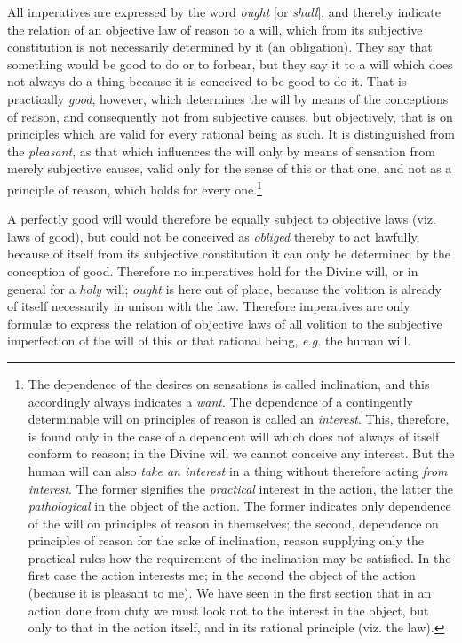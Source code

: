 All imperatives are expressed by the word \textit{ought} [or
\textit{shall}], and thereby indicate the relation of an objective law
of reason to a will, which from its subjective constitution is not
necessarily determined by it (an obligation). They say that something
would be good to do or to forbear, but they say it to a will which
does not always do a thing because it is conceived to be good to do
it. That is practically \textit{good}, however, which determines the
will by means of the conceptions of reason, and consequently not from
subjective causes, but objectively, that is on principles which are
valid for every rational being as such. It is distinguished from the
\textit{pleasant}, as that which influences the will only by means of
sensation from merely subjective causes, valid only for the sense of
this or that one, and not as a principle of reason, which holds for
every one.\footnote{The dependence of the desires on sensations is
called inclination, and this accordingly always indicates a
\textit{want}. The dependence of a contingently determinable will on
principles of reason is called an \textit{interest}. This, therefore,
is found only in the case of a dependent will which does not always of
itself conform to reason; in the Divine will we cannot conceive any
interest. But the human will can also \textit{take an interest} in a
thing without therefore acting \textit{from interest}. The former
signifies the \textit{practical} interest in the action, the latter
the \textit{pathological} in the object of the action. The former
indicates only dependence of the will on principles of reason in
themselves; the second, dependence on principles of reason for the
sake of inclination, reason supplying only the practical rules how the
requirement of the inclination may be satisfied. In the first case the
action interests me; in the second the object of the action (because
it is pleasant to me). We have seen in the first section that in an
action done from duty we must look not to the interest in the object,
but only to that in the action itself, and in its rational principle
(viz. the law).}

A perfectly good will would therefore be equally subject to
objective laws (viz. laws of good), but could not be conceived as
\textit{obliged} thereby to act lawfully, because of itself from its
subjective constitution it can only be determined by the conception of
good. Therefore no imperatives hold for the Divine will, or in general
for a \textit{holy} will; \textit{ought} is here out of place, because
the volition is already of itself necessarily in unison with the law.
Therefore imperatives are only formul\ae{} to express the relation of
objective laws of all volition to the subjective imperfection of the
will of this or that rational being, \textit{e.g.} the human will.

